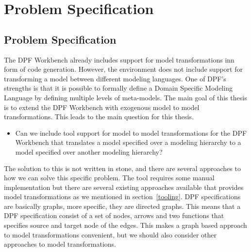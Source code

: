 
\chapter{Problem Specification} %

\label{Chapter4} %



\section{Problem Specification}
\label{problem}

The DPF Workbench already includes support for model transformations inn form
of code generation. However, the environment does not include support for
transforming a model between different modeling languages. One of DPF's
strengths is that it is possible to formally define a Domain Specific Modeling
Language by defining multiple levels of meta-models. The main goal of this
thesis is to extend the DPF Workbench with exogenous model to model
transformations. This leads to the main question for this thesis.
 
\begin{itemize}
  
  \item Can we include tool support for model to model transformations for the
  DPF Workbench that translates a model specified over a modeling hierarchy to a
  model specified over another modeling hierarchy?

\end{itemize}

The solution to this is not written in stone, and there are several approaches
to how we can solve this specific problem. The tool requires some manual
implementation but there are several existing approaches available that provides model
transformations as we mentioned in section~\ref{tooling}. DPF specifications are
basically graphs, more specific, they are directed graphs. This means that a
DPF specification consist of a set of nodes, arrows and two functions
that specifies source and target node of the edges. This makes a graph based
approach to model transformations convenient, but we should also consider other
approaches to model transformations.

